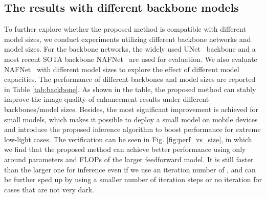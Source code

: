 \documentclass[10pt,twocolumn,letterpaper]{article}
\begin{document}
\subsection{The results with different backbone models}
To further explore whether the proposed method is compatible with different model sizes, we conduct experiments utilizing different backbone networks and model sizes. For the backbone networks, the widely used UNet~\cite{wei2020physics} backbone and a most recent SOTA backbone NAFNet~\cite{chen2022simple} are used for evaluation. We also evaluate NAFNet~\cite{chen2022simple} with different model sizes to explore the effect of different model capacities. The performance of different backbones and model sizes are reported in Table \ref{tab:backbone}. As shown in the table, the proposed method can stably improve the image quality of enhancement results under different backbones/model sizes. Besides, the most significant improvement is achieved for small models, which makes it possible to deploy a small model on mobile devices and introduce the proposed inference algorithm to boost performance for extreme low-light cases. The verification can be seen in Fig. \ref{fig:perf_vs_size}, in which we find that the proposed method can achieve better performance using only around  parameters and FLOPs of the larger feedforward model. It is still faster than the larger one for inference even if we use an iteration number of , and can be further sped up by using a smaller number of iteration steps or no iteration for cases that are not very dark.
\end{document}
